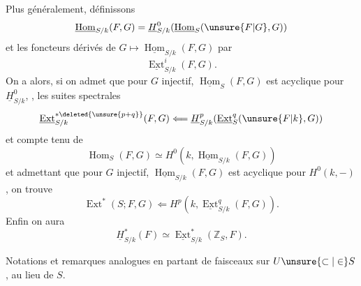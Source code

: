 Plus généralement, définissons
\[
\underline{\operatorname{Hom}}_{S/k}(F,G)=
\underline H^0_{S/k}(\underline{\operatorname{Hom}}_S(\unsure{F|G},G))
\]
 et  les foncteurs dérivés de
$G\longmapsto\underline{\operatorname{Hom}}_{S/k}(F,G)$ par
\[
\underline{\operatorname{Ext}}^i_{S/k}(F,G).
\]
On a alors, si on admet que pour $G$ injectif,
$\underline{\operatorname{Hom}}_S(F,G)$ est acyclique pour
$\underline H^0_{S/k}$, , les suites spectrales
\[
\underline{\operatorname{Ext}}^{*\deleted{\unsure{p+q}}}_{S/k}(F,G)
\Longleftarrow\underline H^p_{S/k}
(\underline{\operatorname{Ext}}^q_S(\unsure{F|k},G))
\]
et compte tenu de
\[
\operatorname{Hom}_S(F,G)\simeq
H^0(k,\underline{\operatorname{Hom}}_{S/k}(F,G))
\]
et admettant que pour $G$ injectif,
$\underline{\operatorname{Hom}}_{S/k}(F,G)$ est acyclique pour $H^0(k,-)$,
on trouve
\[
\operatorname{Ext}^*(S;F,G)\Longleftarrow
H^p(k,\underline{\operatorname{Ext}}^q_{S/k}(F,G)).
\]
Enfin on aura
\[
\underline H^*_{S/k}(F)\simeq
\underline{\operatorname{Ext}}^*_{S/k}(\mathbb Z_S,F).
\]

Notations et remarques analogues en partant de faisceaux sur
$U\unsure{\subset|\in}S$, au lieu de $S$.

